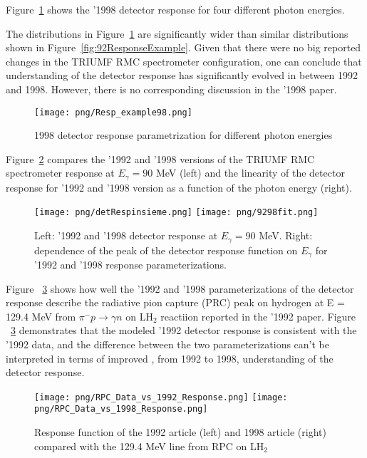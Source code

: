 Figure~\ref{fig:response98} shows the '1998 detector response for four different photon energies.

The distributions in Figure~\ref{fig:response98} are significantly wider than similar distributions
shown in Figure~\ref{fig:92ResponseExample}. Given that there were no big reported changes in the TRIUMF
RMC spectrometer configuration, one can conclude that understanding of the detector response has
significantly evolved in between 1992 and 1998. However, there is no corresponding discussion 
in the '1998 paper. 

\begin{figure}[!h]
\centering
\texttt{[image: png/Resp\_example98.png]}
\caption{1998 detector response parametrization for different photon energies}
\label{fig:response98}
\end{figure}

Figure~\ref{fig:shapecomp} compares the '1992 and '1998 versions of the
TRIUMF RMC spectrometer response at $E_{\gamma}=90$ MeV (left) and 
the linearity of the detector response for '1992 and '1998 version
as a function of the photon energy (right).

\begin{figure} [!h]
\centering
\texttt{[image: png/detRespinsieme.png]}
\texttt{[image: png/9298fit.png]}
\caption{
  Left: '1992 and '1998 detector response at $E_{\gamma}=90$ MeV.
  Right: dependence of the peak of the detector response function on $E_{\gamma}$
  for '1992 and '1998 response parameterizations.
}
\label{fig:shapecomp} 
\end{figure}

Figure ~\ref{p004} shows how well the '1992 and '1998 parameterizations of the detector
response describe the radiative pion capture (PRC) peak on hydrogen at E = 129.4 MeV
from $\pi^{-}p \rightarrow \gamma n$ on LH$_{2}$ reactiion reported in the '1992 paper.
Figure ~\ref{p004} demonstrates that the modeled '1992 detector response is consistent
with the '1992 data, and the difference between the two parameterizations can't be
interpreted in terms of improved , from 1992 to 1998, understanding of the detector
response.\\

  \begin{figure}[!h]
 \begin{center}
 \texttt{[image: png/RPC\_Data\_vs\_1992\_Response.png]} 
 \texttt{[image: png/RPC\_Data\_vs\_1998\_Response.png]} 
 \end{center}
 \caption{Response function of the 1992 article (left) and 1998 article (right) compared with the 129.4 MeV line from RPC on LH$_{2}$}
 \label{p004}
 \end{figure}

